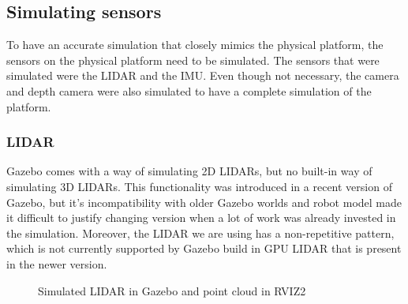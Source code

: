 \documentclass[12pt]{article}
\begin{document}
    \subsection{Simulating sensors}

        To have an accurate simulation that closely mimics the physical platform, the sensors on the physical platform need to be simulated. The sensors that were simulated were the LIDAR and the IMU. Even though not necessary, the camera and depth camera were also simulated to have a complete simulation of the platform.

        \subsubsection{LIDAR}

        Gazebo comes with a way of simulating 2D LIDARs, but no built-in way of simulating 3D LIDARs. This functionality was introduced in a recent version of Gazebo, but it's incompatibility with older Gazebo worlds and robot model made it difficult to justify changing version when a lot of work was already invested in the simulation. Moreover, the LIDAR we are using has a non-repetitive pattern, which is not currently supported by Gazebo build in GPU LIDAR that is present in the newer version. 
        
                \begin{figure}[H]
                    \centering
                    \caption{Simulated LIDAR in Gazebo and point cloud in RVIZ2}
                    \label{fig:lidar_simulation}
                \end{figure}
        
\end{document}
